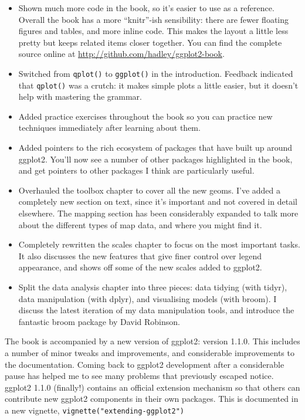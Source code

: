 \begin{itemize}
\item
  Shown much more code in the book, so it's easier to use as a
  reference. Overall the book has a more ``knitr''-ish sensibility:
  there are fewer floating figures and tables, and more inline code.
  This makes the layout a little less pretty but keeps related items
  closer together. You can find the complete source online at
  \url{http://github.com/hadley/ggplot2-book}.
\item
  Switched from \texttt{qplot()} to \texttt{ggplot()} in the
  introduction. Feedback indicated that \texttt{qplot()} was a crutch:
  it makes simple plots a little easier, but it doesn't help with
  mastering the grammar.
\item
  Added practice exercises throughout the book so you can practice new
  techniques immediately after learning about them.
\item
  Added pointers to the rich ecosystem of packages that have built up
  around ggplot2. You'll now see a number of other packages highlighted
  in the book, and get pointers to other packages I think are
  particularly useful.
\item
  Overhauled the toolbox chapter to cover all the new geoms. I've added
  a completely new section on text, since it's important and not covered
  in detail elsewhere. The mapping section has been considerably
  expanded to talk more about the different types of map data, and where
  you might find it.
\item
  Completely rewritten the scales chapter to focus on the most important
  tasks. It also discusses the new features that give finer control over
  legend appearance, and shows off some of the new scales added to
  ggplot2.
\item
  Split the data analysis chapter into three pieces: data tidying (with
  tidyr), data manipulation (with dplyr), and visualising models (with
  broom). I discuss the latest iteration of my data manipulation tools,
  and introduce the fantastic broom package by David Robinson.
\end{itemize}

The book is accompanied by a new version of ggplot2: version 1.1.0. This
includes a number of minor tweaks and improvements, and considerable
improvements to the documentation. Coming back to ggplot2 development
after a considerable pause has helped me to see many problems that
previously escaped notice. ggplot2 1.1.0 (finally!) contains an official
extension mechanism so that others can contribute new ggplot2 components
in their own packages. This is documented in a new vignette,
\texttt{vignette("extending-ggplot2")}

